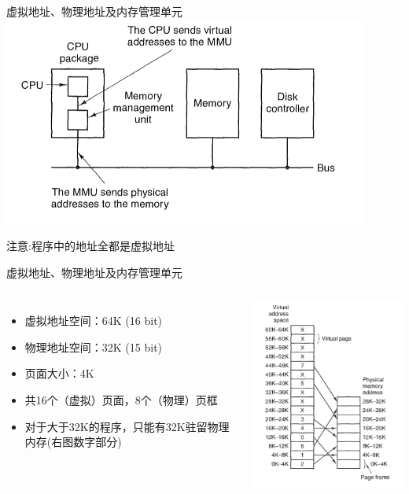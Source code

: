 \documentclass[xcolor=svgnames]{beamer}
\begin{document}
\begin{CJK*}{UTF8}{gbsn}
\begin{frame}{虚拟地址、物理地址及内存管理单元}
\includegraphics[width=0.9\textwidth]{mmu.png}

\alert{注意}:程序中的地址全都是虚拟地址
\end{frame}

\begin{frame}{虚拟地址、物理地址及内存管理单元}
\begin{columns}%
\begin{itemize}
\item 虚拟地址空间：64K (16 bit)
\item 物理地址空间：32K (15 bit)
\item 页面大小：4K 
\item 共16个（虚拟）页面，8个（物理）页框
\item 对于大于32K的程序，只能有32K驻留物理内存(右图数字部分)
\end{itemize}
\includegraphics[width=1.0\textwidth]{vm.png}
\end{columns}%
\end{frame}


\end{CJK*}
\end{document}
